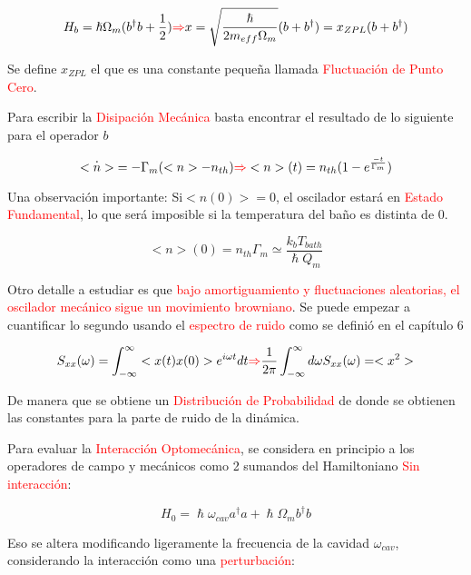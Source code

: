 \documentclass{book}
\begin{document}
\begin{equation}\label{eq9.15}H_b=\hslash\Omega_m (b^\dag b+\frac{1}{2})\textcolor{red}{\Rightarrow} x= \sqrt{\frac{\hslash}{2m_{eff}\Omega_m}}(b+b^\dag)=x_{ZPL}(b+b^\dag)\end{equation}

Se define $x_{ZPL}$ el que es una constante pequeña llamada \textcolor{red}{Fluctuación de Punto Cero}. 

Para escribir la \textcolor{red}{Disipación Mecánica} basta encontrar el resultado de lo siguiente para el operador $b$

\begin{equation}\label{eq9.16}\dot{<n>}=-\Gamma_m(<n>-n_{th})\textcolor{red}{\Rightarrow} <n>(t)=n_{th}(1-e^{\frac{-t}{\Gamma_m}})\end{equation}

Una observación importante: Si$ <n(0)>=0$, el oscilador estará en \textcolor{red}{Estado Fundamental}, lo que será imposible si la temperatura del baño es distinta de 0.

\begin{equation}\label{eq9.17}<n>(0)=n_{th}\Gamma_m\simeq\frac{k_b T_{bath}}{\hslash Q_m}\end{equation}

Otro detalle a estudiar es que \textcolor{red}{bajo amortiguamiento y fluctuaciones aleatorias, el oscilador mecánico sigue un movimiento browniano}. Se puede empezar a cuantificar lo segundo usando el \textcolor{red}{espectro de ruido} como se definió en el capítulo 6

\begin{equation}\label{eq9.18}S_{xx}(\omega)=\int_{-\infty}^\infty <x(t)x(0)>e^{i\omega t} dt\textcolor{red}{\Rightarrow}\frac{1}{2\pi}\int_{-\infty}^\infty d\omega S_{xx}(\omega)= <x^2>\end{equation}

De manera que se obtiene un \textcolor{red}{Distribución de Probabilidad} de donde se obtienen las constantes para la parte de ruido de la dinámica.

Para evaluar la \textcolor{red}{Interacción Optomecánica}, se considera en principio a los operadores de campo y mecánicos como 2 sumandos del Hamiltoniano \textcolor{red}{Sin interacción}:

\begin{equation}\label{eq9.19}H_0=\hslash\omega_{cav}a^\dag a+\hslash\Omega_m b^\dag b\end{equation}

Eso se altera modificando ligeramente la frecuencia de la cavidad $\omega_{cav}$, considerando la interacción como una \textcolor{red}{perturbación}:
\end{document}
